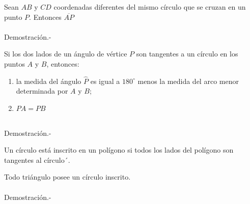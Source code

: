     \begin{proposicion} Sean $AB$ y $CD$ coordenadas diferentes del mismo círculo que se cruzan en un punto $P$. Entonces $\overline{AP} $\\\\
	Demostración.-\;
    \end{proposicion}

    \begin{proposicion}
	Si los dos lados de un ángulo de vértice $P$ son tangentes a un círculo en los puntos $A$ y $B$, entonces:
	\begin{enumerate}[\bfseries a)]
	    \item la medida del ángulo $\widehat{P}$ es igual a $180^{\circ}$ menos la medida del arco menor determinada por $A$ y $B$;
	    \item $PA=PB$\\\\
	\end{enumerate}
	    Demostración.-\;
    \end{proposicion}

\begin{tcolorbox}[colframe=white]
    \begin{def.} Un círculo está inscrito en un polígono si todos los lados del polígono son tangentes al círculo´.
    \end{def.}
\end{tcolorbox}

    \begin{proposicion} Todo triángulo posee un círculo inscrito.\\\\
	Demostración.-\;
    \end{proposicion}

